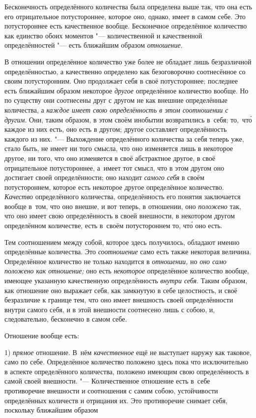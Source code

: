 Бесконечность определённого количества была определена выше так, что она
есть его отрицательное потустороннее, которое оно, однако, имеет в самом
себе. Это потустороннее есть качественное вообще. Бесконечное определённое
количество как единство обоих моментов "--- количественной и качественной
определённостей "--- есть ближайшим образом {\em отношение}.

В отношении определённое количество уже более не обладает лишь безразличной
определённостью, а качественно определено как безоговорочно соотнесённое со
своим потусторонним. Оно продолжает себя в своё потустороннее; последнее есть
ближайшим образом некоторое {\em другое} определённое количество вообще. Но по
существу они соотнесены друг с другом не как внешние определённые количества, а
{\em каждое имеет свою определённость в этом соотношении с другим}. Они, таким
образом, в этом своём инобытии возвратились в~себя; то,~чт\'{о} каждое из них
есть, оно есть в другом; другое составляет определённость каждого из них. "---
Выхождение определённого количества за себя теперь уже, стало быть, не имеет ни
того смысла, что оно изменяется лишь в некоторое другое, ни того, что оно
изменяется в своё абстрактное другое, в своё отрицательное потустороннее,
а~имеет тот смысл, что в этом другом оно достигает своей определённости; оно
находит {\em самого себя} в своём потустороннем, которое есть некоторое другое
определённое количество. {\em Качество} определённого количества,
определённость его понятия заключается вообще в~том, что оно внешне, и вот
теперь, в отношении, оно {\em положено} так, что оно имеет свою определённость
в своей внешности, в некотором другом определённом количестве, есть в~своём
потустороннем то, чт\'{о} оно есть.

Тем соотношением между собой, которое здесь получилось, обладают именно
определённые количества. Это {\em соотношение} само есть также некоторая
величина. Определённое количество не только находится в {\em отношении,} но
{\em оно само положено как отношение;} оно есть {\em некоторое} определённое
количество вообще, имеющее указанную качественную определённость
{\em внутри себя}. Таким образом, как отношение оно выражает себя, как
замкнутую в себе целостность, и своё безразличие к границе тем, что оно имеет
внешность своей определённости внутри самого себя, и в этой внешности
соотнесено лишь с собою, и, следовательно, бесконечно в самом себе.

Отношение вообще есть:

1) {\em прямое} отношение. В~нём {\em качественное} ещё не выступает наружу как
таковое, само по себе. Определённое количество положено здесь пока что
исключительно в аспекте определённого количества, положено имеющим свою
определённость в самой своей внешности. "--- Количественное отношение есть
в~себе противоречие внешности и соотношения с самим собою, устойчивости
определённых количеств и отрицания их. Это противоречие снимает себя, поскольку
ближайшим образом

